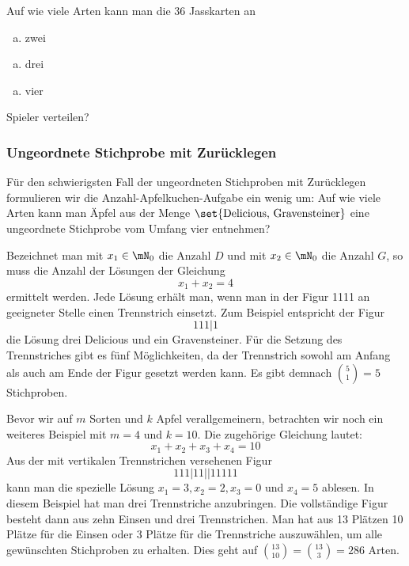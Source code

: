 \documentclass[%
11pt,%
twoside,%
titlepage,%
german,%
headsepline%
]{scrartcl}
\begin{document}
\begin{ueb}[Jass]
Auf wie viele Arten kann man die 36 Jasskarten an

\begin{minipage}{2cm}
\begin{enumerate}[a)]
\item zwei
\end{enumerate}
\end{minipage}
\begin{minipage}{2cm}
\begin{enumerate}[a)]
\addtocounter{enumi}{1}
\item drei
\end{enumerate}
\end{minipage}
\begin{minipage}{2cm}
\begin{enumerate}[a)]
\addtocounter{enumi}{2}
\item vier
\end{enumerate}
\end{minipage}

Spieler verteilen?
\end{ueb}

\subsubsection{Ungeordnete Stichprobe mit Zurücklegen}
Für den schwierigsten Fall der ungeordneten Stichproben mit Zurücklegen formulieren wir die Anzahl-Apfelkuchen-Aufgabe ein wenig um: Auf wie viele Arten kann man \"Apfel aus der Menge $\set{\text{Delicious, Gravensteiner}}$ eine ungeordnete Stichprobe vom Umfang vier entnehmen?

Bezeichnet man mit $x_1\in\mN_0$ die Anzahl $D$ und mit $x_2\in\mN_0$ die Anzahl $G$, so muss die Anzahl der Lösungen der Gleichung $$x_1+x_2=4$$ ermittelt werden. Jede Lösung erhält man, wenn man in der Figur 1111 an geeigneter Stelle einen Trennstrich einsetzt. Zum Beispiel entspricht der Figur $$111|1$$ die Lösung drei Delicious und ein Gravensteiner. Für die Setzung des Trennstriches gibt es fünf Möglichkeiten, da der Trennstrich sowohl am Anfang als auch am Ende der Figur gesetzt werden kann. Es gibt demnach $\binom{5}{1}=5$ Stichproben.

Bevor wir auf $m$ Sorten und $k$ Apfel verallgemeinern, betrachten wir noch ein weiteres Beispiel mit $m=4$ und $k=10$. Die zugehörige Gleichung lautet: $$x_1+x_2+x_3+x_4=10$$ Aus der mit vertikalen Trennstrichen versehenen Figur $$111|11||11111$$ kann man die spezielle Lösung $x_1 = 3, x_2 = 2, x_3 = 0$ und $x_4 = 5$ ablesen. In diesem Beispiel hat man drei Trennstriche anzubringen. Die vollständige Figur besteht dann aus zehn Einsen und drei Trennstrichen. Man hat aus 13 Plätzen 10 Plätze für die Einsen oder 3 Plätze für die Trennstriche
auszuwählen, um alle gewünschten Stichproben zu erhalten. Dies geht auf $\binom{13}{10}=\binom{13}{3}=286$ Arten.
\end{document}
